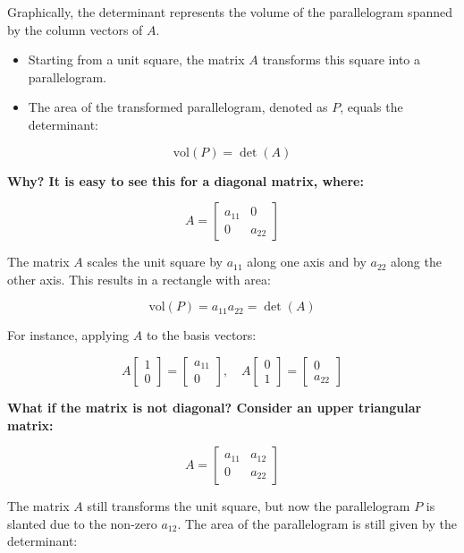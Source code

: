 \begin{intuition}
    Graphically, the determinant represents the volume of the parallelogram spanned by the column vectors of $A$. 
    \begin{itemize}
        \item Starting from a unit square, the matrix $A$ transforms this square into a parallelogram. 
        \item The area of the transformed parallelogram, denoted as $P$, equals the determinant:
    \end{itemize}

    \[
    \text{vol}(P) = \det(A)
    \]

    \textbf{Why? It is easy to see this for a diagonal matrix, where:}

    \[
    A = \begin{bmatrix} a_{11} & 0 \\ 0 & a_{22} \end{bmatrix}
    \]

    The matrix $A$ scales the unit square by $a_{11}$ along one axis and by $a_{22}$ along the other axis. This results in a rectangle with area:

    \[
    \text{vol}(P) = a_{11}a_{22} = \det(A)
    \]

    For instance, applying $A$ to the basis vectors:

    \[
    A \begin{bmatrix} 1 \\ 0 \end{bmatrix} = \begin{bmatrix} a_{11} \\ 0 \end{bmatrix}, \quad A \begin{bmatrix} 0 \\ 1 \end{bmatrix} = \begin{bmatrix} 0 \\ a_{22} \end{bmatrix}
    \]


    \textbf{What if the matrix is not diagonal? Consider an upper triangular matrix:}

    \[
    A = \begin{bmatrix} a_{11} & a_{12} \\ 0 & a_{22} \end{bmatrix}
    \]

    The matrix $A$ still transforms the unit square, but now the parallelogram $P$ is slanted due to the non-zero $a_{12}$. The area of the parallelogram is still given by the determinant:


\end{intuition}

